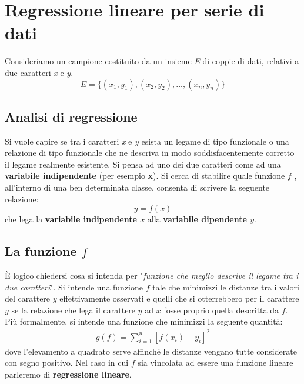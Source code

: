 \section{Regressione lineare per serie di dati}
Consideriamo un campione costituito da un insieme \textit{E} di coppie di dati, relativi a due caratteri \textit{x} e \textit{y}.
\[E = \{(x_1, y_1), (x_2, y_2), ..., (x_n, y_n) \}\]


\subsection{Analisi di regressione}
Si vuole capire se tra i caratteri \textit{x} e \textit{y} esista un legame di tipo funzionale o una relazione di tipo funzionale che ne descriva in modo soddisfacentemente corretto il legame realmente esistente. \newline
Si pensa ad uno dei due caratteri come ad una \textbf{variabile indipendente} (per esempio \textbf{x}). Si cerca di stabilire quale funzione $f$ , all'interno di una ben determinata classe, consenta di scrivere la seguente relazione:
\[ y = f(x)\]
che lega la \textbf{variabile indipendente $x$ }alla \textbf{variabile dipendente $y$}. \newline

\subsection{La funzione $f$}
È logico chiedersi cosa si intenda per "\textit{funzione che meglio descrive il legame tra i due caratteri}". \newline
Si intende una funzione $f$ tale che minimizzi le distanze tra i valori del carattere $y$ effettivamente osservati e quelli che si otterrebbero per il carattere $y$ se la relazione che lega il carattere $y$ ad $x$ fosse proprio quella descritta da $f$. \newline
Più formalmente, si intende una funzione che minimizzi la seguente quantità:
\begin{align}	
	g(f) = \sum_{i = 1}^{n} [f(x_i) - y_i]^2
\end{align}
dove l'elevamento a quadrato serve affinché le distanze vengano tutte considerate con segno positivo.
Nel caso in cui $f$ sia vincolata ad essere una funzione lineare parleremo di \textbf{regressione lineare}.

